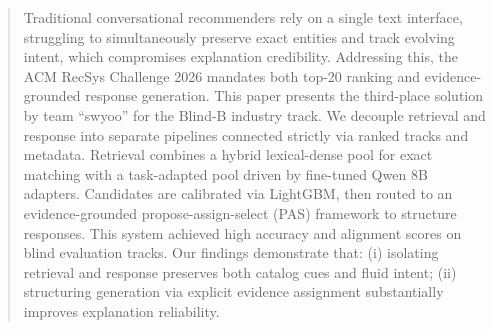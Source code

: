 \begin{abstract}

Traditional conversational recommenders rely on a single text interface, struggling to simultaneously preserve exact entities and track evolving intent, which compromises explanation credibility. Addressing this, the ACM RecSys Challenge 2026 mandates both top-20 ranking and evidence-grounded response generation. This paper presents the third-place solution by team ``swyoo'' for the Blind-B industry track. We decouple retrieval and response into separate pipelines connected strictly via ranked tracks and metadata. Retrieval combines a hybrid lexical-dense pool for exact matching with a task-adapted pool driven by fine-tuned Qwen 8B adapters. Candidates are calibrated via LightGBM, then routed to an evidence-grounded propose-assign-select (PAS) framework to structure responses. This system achieved high accuracy and alignment scores on blind evaluation tracks. Our findings demonstrate that: (i) isolating retrieval and response preserves both catalog cues and fluid intent; (ii) structuring generation via explicit evidence assignment substantially improves explanation reliability.
\end{abstract}